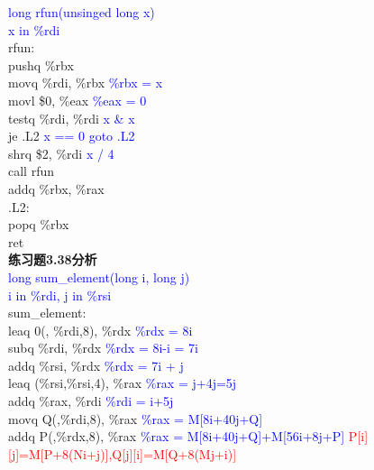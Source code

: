 \documentclass{article}
\newcommand{\blue}[1]{\textcolor{blue}{#1}}
\newcommand{\red}[1]{\textcolor{red}{#1}}
\begin{document}
\begin{CJK}{UTF8}{gbsn}
\blue{long rfun(unsinged long x)}	\\
\blue{x in \%rdi}	\\
rfun:	\\
	\hspace*{1em}pushq \%rbx	\\
	\hspace*{1em}movq \%rdi, \%rbx	\blue{\%rbx = x}\\
	\hspace*{1em}movl \$0, \%eax	\blue{\%eax = 0}\\
	\hspace*{1em}testq \%rdi, \%rdi	\blue{x \& x}\\
	\hspace*{1em}je .L2	\blue{x ==  0 goto .L2}\\
	\hspace*{1em}shrq \$2, \%rdi	\blue{x / 4}\\
	\hspace*{1em}call rfun	\\
	\hspace*{1em}addq \%rbx, \%rax	\\
.L2:	\\
	\hspace*{1em}popq \%rbx	\\
	\hspace*{1em}ret	\\
\textbf{练习题3.38分析}	\\
\blue{long sum\_element(long i, long j)}	\\
\blue{i in \%rdi, j in \%rsi}	\\
sum\_element:	\\
\hspace*{1em}leaq 0(, \%rdi,8), \%rdx	\blue{\%rdx = 8i}	\\
\hspace*{1em}subq \%rdi, \%rdx	\blue{\%rdx = 8i-i = 7i}	\\
\hspace*{1em}addq \%rsi, \%rdx	\blue{\%rdx = 7i + j}	\\
\hspace*{1em}leaq (\%rsi,\%rsi,4), \%rax	\blue{\%rax = j+4j=5j}	\\
\hspace*{1em}addq \%rax, \%rdi	\blue{\%rdi = i+5j}	\\
\hspace*{1em}movq Q(,\%rdi,8), \%rax	\blue{\%rax = M[8i+40j+Q]}	\\
\hspace*{1em}addq P(,\%rdx,8), \%rax	\blue{\%rax = M[8i+40j+Q]+M[56i+8j+P]}	\red{P[i][j]=M[P+8(Ni+j)],Q[j][i]=M[Q+8(Mj+i)]}	\\

\end{CJK}
\end{document}
